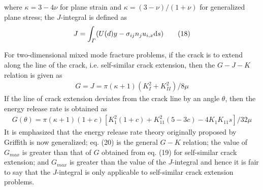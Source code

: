 \documentclass[11pt]{article}
\begin{document}
where $\kappa = 3 - 4 \nu$ for plane strain and $\kappa = (3 - \nu)/(1 + \nu)$ for generalized plane stress;
the $J$-integral is defined as
\begin{align*}
    J = \int_\varGamma (U \text(d)y - \sigma_{ij} n_j u_{i, x}\text{d}s) \tag{18} \label{18}
\end{align*}

For two-dimensional mixed mode fracture problems, if the crack is to extend along the line
of the crack, i.e. self-similar crack extension, then the $G - J - K$ relation is given as
\begin{align*}
    G = J = \pi (\kappa + 1)(K_{I}^{2} + K_{II}^{2})/8\mu \tag{19} \label{19}
\end{align*}
If the line of crack extension deviates from the crack line by an angle $\theta$, then the energy release
rate is obtained as
\begin{align*}
    G(\theta) = \pi(\kappa + 1)(1 + c)[K_{1}^{2}(1+c) + K_{11}^2(5-3c)-4K_{1}K_{11}s]/32\mu \tag{20} \label{20}
\end{align*}
It is emphasized that the energy release rate theory originally proposed by Griffith is now
generalized; eq. (20) is the general $G - K$ relation; the value of $G_{max}$ is greater than that of $G$ obtained
from eq. (19) for self-similar crack extension; and $G_{max}$ is greater than the value of the $J$-integral
and hence it is fair to say that the $J$-integral is only applicable to self-similar crack extension
problems.
\end{document}
